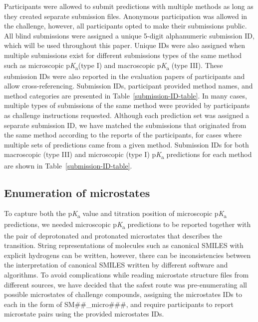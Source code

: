 \documentclass[9pt,lineno,final]{elife}
\newcommand{\pKa}{p\textit{K}\textsubscript{a}}
\begin{document}
Participants were allowed to submit predictions with multiple methods as long as they created separate submission files. Anonymous participation was allowed in the challenge, however, all participants opted to make their submissions public.
All blind submissions were assigned a unique 5-digit alphanumeric submission ID, which will be used throughout this paper. Unique IDs were also assigned when multiple submissions exist for different submissions types of the same method such as microscopic \pKa{}(type I) and macroscopic \pKa{} (type III). 
These submission IDs were also reported in the evaluation papers of participants and allow cross-referencing. Submission IDs, participant provided method names, and method categories are presented in Table~\ref{submission-ID-table}. 
In many cases, multiple types of submissions of the same method were provided by participants as challenge instructions requested. 
Although each prediction set was assigned a separate submission ID, we have matched the submissions that originated from the same method according to the reports of the participants, for cases where multiple sets of predictions came from a given method.
Submission IDs for both macroscopic (type III) and microscopic (type I) \pKa{} predictions for each method are shown in Table~\ref{submission-ID-table}. 





\subsection{Enumeration of microstates} \label{section-enumeration-of-microstates}

To capture both the \pKa{} value and titration position of microscopic \pKa{} predictions, we needed microscopic \pKa{} predictions to be reported together with the pair of deprotonated and protonated microstates that describes the transition. 
String representations of molecules such as canonical SMILES with explicit hydrogens can be written, however, there can be inconsistencies between the interpretation of canonical SMILES written by different software and algorithms.
To avoid complications while reading microstate structure files from different sources, we have decided that the safest route was pre-enumerating all possible microstates of challenge compounds, assigning the microstates IDs to each in the form of SM\#\#\_micro\#\#\#, and require participants to report microstate pairs using the provided microstates IDs.   
\end{document}
